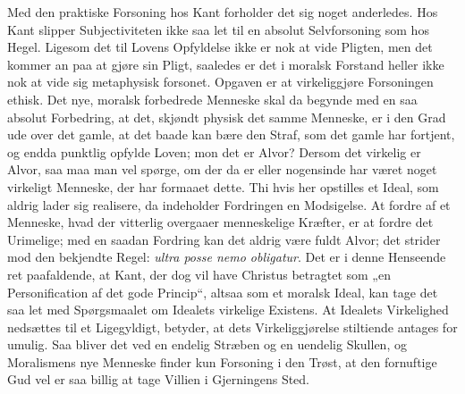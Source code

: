 \documentclass[12pt]{book}
\begin{document}
Med den praktiske Forsoning hos Kant forholder det sig noget
anderledes. Hos Kant slipper Subjectiviteten ikke saa let til en
absolut Selvforsoning som hos Hegel. Ligesom det til Lovens
Opfyldelse ikke er nok at vide Pligten, men det kommer an paa at
gjøre sin Pligt, saaledes er det i moralsk Forstand heller ikke nok
at vide sig metaphysisk forsonet. Opgaven er at virkeliggjøre
Forsoningen ethisk. Det nye, moralsk forbedrede Menneske skal da
begynde med en saa absolut Forbedring, at det, skjøndt physisk det
samme Menneske, er i den Grad ude over det gamle, at det baade kan
bære den Straf, som det gamle har fortjent, og endda punktlig
opfylde Loven; mon det er Alvor? Dersom det virkelig
er Alvor, saa maa man vel spørge, om der da er eller nogensinde har
været noget virkeligt Menneske, der har formaaet dette. Thi hvis her
opstilles et Ideal, som aldrig lader sig realisere, da indeholder
Fordringen en Modsigelse. At fordre af et Menneske, hvad der
vitterlig overgaaer menneskelige Kræfter, er at fordre det Urimelige;
med en saadan Fordring kan det aldrig være fuldt Alvor; det strider
mod den bekjendte Regel: \textit{ultra posse nemo obligatur}. Det er
i denne Henseende ret paafaldende, at Kant, der dog vil have
Christus betragtet som „en Personification af det gode Princip“,
altsaa som et moralsk Ideal, kan tage det saa let med Spørgsmaalet
om Idealets virkelige Existens. At Idealets Virkelighed nedsættes
til et Ligegyldigt, betyder, at dets Virkeliggjørelse stiltiende
antages for umulig. Saa bliver det ved en endelig Stræben og en
uendelig Skullen, og Moralismens nye Menneske finder kun Forsoning i
den Trøst, at den fornuftige Gud vel er saa billig at tage Villien i
Gjerningens Sted.
\end{document}
